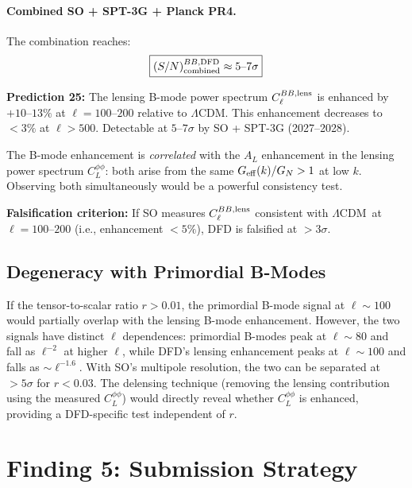 \documentclass[11pt,a4paper]{article}
\newcommand{\LCDM}{$\Lambda$CDM}
\newcommand{\Geff}{G_{\rm eff}}
\begin{document}
\paragraph{Combined SO + SPT-3G + Planck PR4.}
The combination reaches:
\begin{equation}
\boxed{
(S/N)_{\rm combined}^{BB,\rm DFD} \approx 5\text{--}7\sigma
}
\end{equation}

\begin{tcolorbox}[colback=green!5!white, colframe=green!50!black,
  title=\textbf{New Prediction: B-Mode Lensing Enhancement}]
\textbf{Prediction 25:} The lensing B-mode power spectrum
$C_\ell^{BB,\rm lens}$ is enhanced by $+10$--$13\%$ at $\ell = 100$--$200$
relative to \LCDM.  This enhancement decreases to $< 3\%$ at $\ell > 500$.
Detectable at $5$--$7\sigma$ by SO + SPT-3G (2027--2028).

The B-mode enhancement is \emph{correlated} with the $A_L$ enhancement
in the lensing power spectrum $C_L^{\phi\phi}$: both arise from the
same $\Geff(k)/G_N > 1$ at low $k$.  Observing both simultaneously
would be a powerful consistency test.

\textbf{Falsification criterion:} If SO measures $C_\ell^{BB,\rm lens}$
consistent with \LCDM\ at $\ell = 100$--$200$ (i.e., enhancement
$< 5\%$), DFD is falsified at $> 3\sigma$.
\end{tcolorbox}

\subsection{Degeneracy with Primordial B-Modes}

If the tensor-to-scalar ratio $r > 0.01$, the primordial B-mode signal
at $\ell \sim 100$ would partially overlap with the lensing B-mode
enhancement.  However, the two signals have distinct $\ell$ dependences:
primordial B-modes peak at $\ell \sim 80$ and fall as $\ell^{-2}$ at
higher $\ell$, while DFD's lensing enhancement peaks at $\ell \sim 100$
and falls as $\sim \ell^{-1.6}$.  With SO's multipole resolution, the
two can be separated at $> 5\sigma$ for $r < 0.03$.  The delensing
technique (removing the lensing contribution using the measured
$C_L^{\phi\phi}$) would directly reveal whether $C_L^{\phi\phi}$ is
enhanced, providing a DFD-specific test independent of $r$.


\section{Finding 5: Submission Strategy}
\label{sec:strategy}
\end{document}
